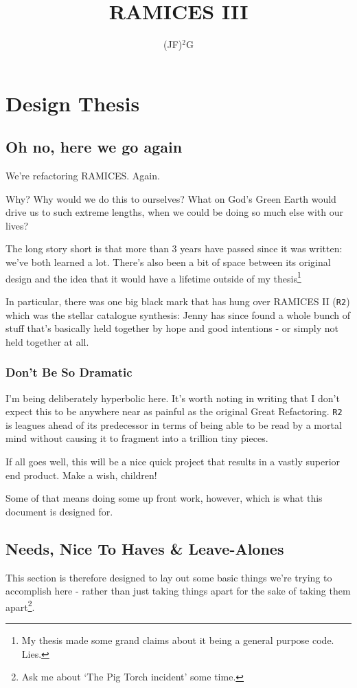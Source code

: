 \documentclass[a4paper,10pt]{article}
\title{RAMICES III}
\author{(JF)$^2$G}
\begin{document}
\setcounter{tocdepth}{2}
\maketitle
\tableofcontents
	\def\RTwo{\texttt{R2}}
	\newpage
	\section{Design Thesis}

		\subsection{Oh no, here we go again}

			We're refactoring RAMICES. Again.

			Why? Why would we do this to ourselves? What on God's Green Earth would drive us to such extreme lengths, when we could be doing so much else with our lives?
			
			The long story short is that more than 3 years have passed since it was written: we've both learned a lot. There's also been a bit of space between its original design and the idea that it would have a lifetime outside of my thesis\footnote{My thesis made some grand claims about it being a general purpose code. Lies.}

			In particular, there was one big black mark that has hung over RAMICES II (\RTwo) which was the stellar catalogue synthesis: Jenny has since found a whole bunch of stuff that's basically held together by hope and good intentions - or simply not held together at all. 

			\subsubsection{Don't Be So Dramatic}

				I'm being deliberately hyperbolic here. It's worth noting in writing that I don't expect this to be anywhere near as painful as the original Great Refactoring. \RTwo{} is leagues ahead of its predecessor in terms of being able to be read by a mortal mind without causing it to fragment into a trillion tiny pieces. 

				If all goes well, this will be a nice quick project that results in a vastly superior end product. Make a wish, children!

				Some of that means doing some up front work, however, which is what this document is designed for.

		\subsection{Needs, Nice To Haves \& Leave-Alones}
			This section is therefore designed to lay out some basic things we're trying to accomplish
			here - rather than just taking things apart for the sake of taking them apart\footnote{Ask me about `The Pig Torch incident' some time.}.
		
\end{document}
